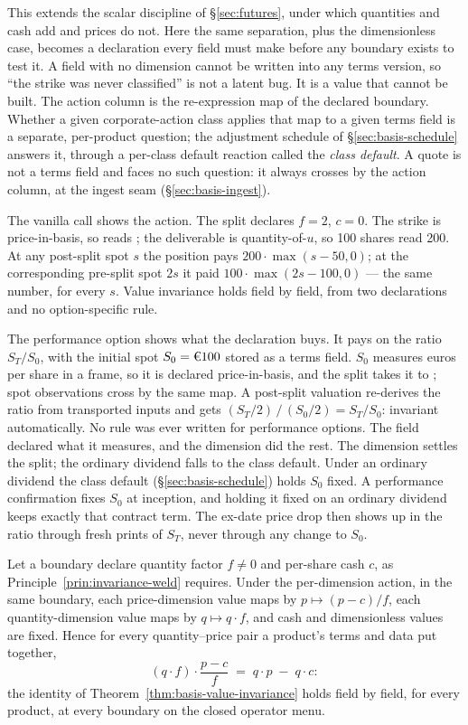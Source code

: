 \noindent
This extends the scalar discipline of \S\ref{sec:futures}, under which
quantities and cash add and prices do not. Here the same separation, plus the
dimensionless case, becomes a declaration every field must make before any
boundary exists to test it. A field with no dimension cannot be written into
any terms version, so ``the strike was never classified'' is not a latent bug.
It is a value that cannot be built.
The action column is the re-expression map of the declared boundary. Whether
a given corporate-action class applies that map to a given terms field is a
separate, per-product question; the adjustment schedule of
\S\ref{sec:basis-schedule} answers it, through a per-class default reaction
called the \emph{class default}. A quote is not a terms field and faces no
such question: it always crosses by the action column, at the ingest seam
(\S\ref{sec:basis-ingest}).

The vanilla call shows the action. The split declares $f=2$, $c=0$. The strike
is price-in-basis, so  reads ; the deliverable is
quantity-of-$u$, so 100 shares read 200. At any post-split spot $s$ the
position pays $200\cdot\max(s-50,0)$; at the corresponding pre-split spot $2s$
it paid $100\cdot\max(2s-100,0)$ --- the same number, for every $s$. Value
invariance holds field by field, from two declarations and no option-specific
rule.

The performance option shows what the declaration buys. It pays on the ratio
$S_T/S_0$, with the initial spot $S_0=\EUR{100}$ stored as a terms field.
$S_0$ measures euros per share in a frame, so it is declared price-in-basis,
and the split takes it to ; spot observations cross by the same map. A
post-split valuation re-derives the ratio from transported inputs and gets
$(S_T/2)\,/\,(S_0/2)=S_T/S_0$: invariant automatically. No rule was ever
written for performance options. The field declared what it measures, and the
dimension did the rest.
The dimension settles the split; the ordinary dividend falls to the class
default. Under an ordinary dividend the class default
(\S\ref{sec:basis-schedule}) holds $S_0$ fixed. A performance confirmation
fixes $S_0$ at inception, and holding it fixed on an ordinary dividend keeps
exactly that contract term. The ex-date price drop then shows up in the ratio
through fresh prints of $S_T$, never through any change to $S_0$.

\begin{theorem}
\label{thm:dimension-invariance}
Let a boundary declare quantity factor $f\neq0$ and per-share cash $c$, as
Principle~\ref{prin:invariance-weld} requires. Under the per-dimension action, in the
same boundary, each price-dimension value maps by $p\mapsto(p-c)/f$, each
quantity-dimension value maps by $q\mapsto q\cdot f$, and cash and
dimensionless values are fixed. Hence for every quantity--price pair a
product's terms and data put together,
\[
(q\cdot f)\cdot\frac{p-c}{f}\;=\;q\cdot p\;-\;q\cdot c:
\]
the identity of Theorem~\ref{thm:basis-value-invariance} holds field by field,
for every product, at every boundary on the closed operator menu.
\end{theorem}

